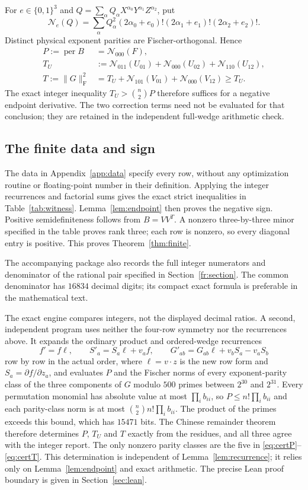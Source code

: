 \documentclass[11pt]{article}
\theoremstyle{remark}\newtheorem{remark}[theorem]{Remark}
\newcommand{\per}{\operatorname{per}}
\newcommand{\F}{\mathrm F}
\newcommand{\NN}[2]{\mathcal N_{#1}(#2)}
\begin{document}
For $e\in\{0,1\}^3$ and $Q=\sum_\alpha Q_\alpha X^{\alpha_0}Y^{\alpha_1}Z^{\alpha_2}$,
put
\[
 \mathcal N_e(Q)=\sum_\alpha Q_\alpha^2
                   (2\alpha_0+e_0)!(2\alpha_1+e_1)!(2\alpha_2+e_2)!.
\]
Distinct physical exponent parities are Fischer-orthogonal. Hence
\begin{align}
 P:=\per B&=\NN{000}{F},\label{eq:certP}\\
 T_U&:=\NN{011}{U_{01}}+\NN{000}{U_{02}}+\NN{110}{U_{12}},\label{eq:certU}\\
 T:=\|G\|_{\F}^2&=T_U+\NN{101}{V_{01}}+\NN{000}{V_{12}}\ge T_U.
 \label{eq:certT}
\end{align}
The exact integer inequality $T_U>\binom n2P$ therefore suffices for
a negative endpoint derivative. The two correction terms need not be
evaluated for that conclusion; they are retained in the independent
full-wedge arithmetic check.

\subsection{The finite data and sign}



The data in Appendix~\ref{app:data} specify every row, without any
optimization routine or floating-point number in their definition.
Applying the integer recurrences and factorial sums gives the exact
strict inequalities in Table~\ref{tab:witness}. Lemma~\ref{lem:endpoint}
then proves the negative sign. Positive semidefiniteness follows from
$B=VV^T$. A nonzero three-by-three minor specified in the table proves
rank three; each row is nonzero, so every diagonal entry is positive.
This proves Theorem~\ref{thm:finite}.

The accompanying package also records the full integer numerators and
denominator of the rational pair specified in Section~\ref{fr:section}.
The common denominator has $16834$ decimal digits; its compact exact
formula is preferable in the mathematical text.

The exact engine compares integers, not the displayed decimal ratios.
A second, independent program uses neither the four-row symmetry nor
the recurrences above. It expands the ordinary product and ordered-wedge
recurrences
\[
 f'=f\ell,\qquad S'_a=S_a\ell+v_af,\qquad
 G'_{ab}=G_{ab}\ell+v_bS_a-v_aS_b
\]
row by row in the actual order, where $\ell=v\cdot z$ is the new row
form and $S_a=\partial f/\partial z_a$, and evaluates $P$ and the
Fischer norms of every exponent-parity class of the three components
of $G$ modulo $500$ primes between $2^{30}$ and $2^{31}$. Every permutation
monomial has absolute value at most $\prod_ib_{ii}$, so
$P\le n!\prod_ib_{ii}$ and each parity-class norm is at most
$\binom n2n!\prod_ib_{ii}$. The product of the primes exceeds this
bound, which has $15471$ bits. The Chinese remainder theorem therefore
determines $P$, $T_U$ and $T$ exactly from the residues, and all three
agree with the integer report. The only nonzero parity classes are the
five in \eqref{eq:certP}--\eqref{eq:certT}. This determination is
independent of Lemma~\ref{lem:recurrence}; it relies only on
Lemma~\ref{lem:endpoint} and exact arithmetic. The precise Lean proof
boundary is given in Section~\ref{sec:lean}.
\end{document}

